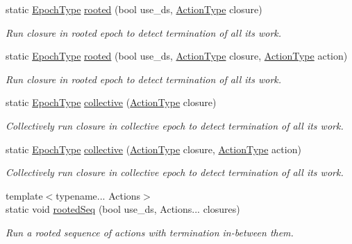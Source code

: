 \begin{DoxyCompactItemize}
\item 
static \hyperlink{namespacevt_a985a5adf291c34a3ca263b3378388236}{Epoch\+Type} \hyperlink{structvt_1_1term_1_1_termination_detector_1_1_scoped_a16ee43366fbcdfcdaf801bf46b078380}{rooted} (bool use\+\_\+ds, \hyperlink{namespacevt_ae0a5a7b18cc99d7b732cb4d44f46b0f3}{Action\+Type} closure)
\begin{DoxyCompactList}\small\item\em Run closure in rooted epoch to detect termination of all its work. \end{DoxyCompactList}\item 
static \hyperlink{namespacevt_a985a5adf291c34a3ca263b3378388236}{Epoch\+Type} \hyperlink{structvt_1_1term_1_1_termination_detector_1_1_scoped_ae74915c3fff83fd890aa2b411e371c19}{rooted} (bool use\+\_\+ds, \hyperlink{namespacevt_ae0a5a7b18cc99d7b732cb4d44f46b0f3}{Action\+Type} closure, \hyperlink{namespacevt_ae0a5a7b18cc99d7b732cb4d44f46b0f3}{Action\+Type} action)
\begin{DoxyCompactList}\small\item\em Run closure in rooted epoch to detect termination of all its work. \end{DoxyCompactList}\item 
static \hyperlink{namespacevt_a985a5adf291c34a3ca263b3378388236}{Epoch\+Type} \hyperlink{structvt_1_1term_1_1_termination_detector_1_1_scoped_a7debccd958f4257512a8640ab1ffb324}{collective} (\hyperlink{namespacevt_ae0a5a7b18cc99d7b732cb4d44f46b0f3}{Action\+Type} closure)
\begin{DoxyCompactList}\small\item\em Collectively run closure in collective epoch to detect termination of all its work. \end{DoxyCompactList}\item 
static \hyperlink{namespacevt_a985a5adf291c34a3ca263b3378388236}{Epoch\+Type} \hyperlink{structvt_1_1term_1_1_termination_detector_1_1_scoped_a199da03a9c1a2fbce14c15484e71bacc}{collective} (\hyperlink{namespacevt_ae0a5a7b18cc99d7b732cb4d44f46b0f3}{Action\+Type} closure, \hyperlink{namespacevt_ae0a5a7b18cc99d7b732cb4d44f46b0f3}{Action\+Type} action)
\begin{DoxyCompactList}\small\item\em Collectively run closure in collective epoch to detect termination of all its work. \end{DoxyCompactList}\item 
{\footnotesize template$<$typename... Actions$>$ }\\static void \hyperlink{structvt_1_1term_1_1_termination_detector_1_1_scoped_ae7fedaf303fa8a72c8b21a6e9a16783f}{rooted\+Seq} (bool use\+\_\+ds, Actions... closures)
\begin{DoxyCompactList}\small\item\em Run a rooted sequence of actions with termination in-\/between them. \end{DoxyCompactList}\end{DoxyCompactItemize}



